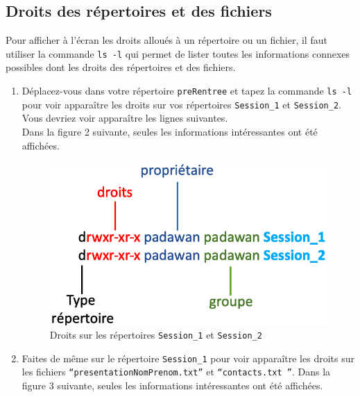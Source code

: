\documentclass{article}
\begin{document}
\hypertarget{droits-des-répertoires-et-des-fichiers}{
\subsection{Droits des répertoires et des fichiers}\label{droits-des-répertoires-et-des-fichiers}}

\begin{exercice}

Pour afficher à l'écran les droits alloués à un répertoire ou un fichier, il faut utiliser la commande \texttt{ls -l} qui permet de lister toutes les 
informations connexes possibles dont les droits des répertoires et des fichiers. 

\begin{enumerate}

\item
Déplacez-vous dans votre répertoire \texttt{preRentree} et tapez la commande \texttt{ls -l} pour voir apparaître les droits sur vos répertoires \texttt{Session\_1} et \texttt{Session\_2}. 
Vous devriez voir apparaître les lignes suivantes.\\
Dans la figure 2 suivante, seules les informations intéressantes ont été affichées.

\begin{figure}[h!]
    \begin{center}
    \includegraphics[scale=0.2]{droitsRep.png}
    \caption{Droits sur les répertoires \texttt{Session\_1} et \texttt{Session\_2}}
     \end{center}
\end{figure}    

\medskip

\item
Faites de même sur le répertoire \texttt{Session\_1} pour voir apparaître les droits sur les fichiers \texttt{``presentationNomPrenom.txt''} et \texttt{``contacts.txt ''}.
Dans la figure 3 suivante, seules les informations intéressantes ont été affichées.


\end{enumerate}
\end{exercice}
\end{document}
